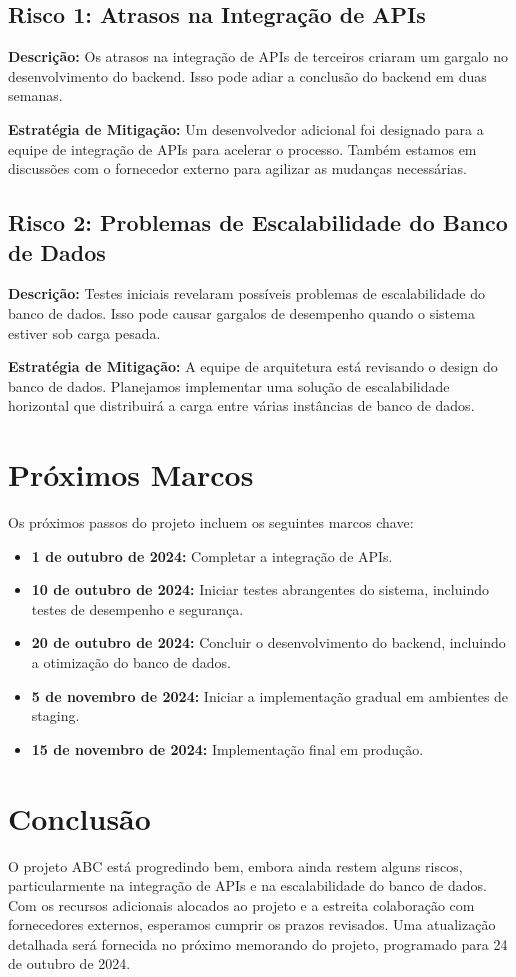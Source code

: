 \documentclass[12pt]{article}
\begin{document}
\subsection{Risco 1: Atrasos na Integração de APIs}
\textbf{Descrição:} Os atrasos na integração de APIs de terceiros criaram um gargalo no desenvolvimento do backend. Isso pode adiar a conclusão do backend em duas semanas.

\textbf{Estratégia de Mitigação:} Um desenvolvedor adicional foi designado para a equipe de integração de APIs para acelerar o processo. Também estamos em discussões com o fornecedor externo para agilizar as mudanças necessárias.

\subsection{Risco 2: Problemas de Escalabilidade do Banco de Dados}
\textbf{Descrição:} Testes iniciais revelaram possíveis problemas de escalabilidade do banco de dados. Isso pode causar gargalos de desempenho quando o sistema estiver sob carga pesada.

\textbf{Estratégia de Mitigação:} A equipe de arquitetura está revisando o design do banco de dados. Planejamos implementar uma solução de escalabilidade horizontal que distribuirá a carga entre várias instâncias de banco de dados.

\section{Próximos Marcos}
Os próximos passos do projeto incluem os seguintes marcos chave:

\begin{itemize}
    \item \textbf{1 de outubro de 2024:} Completar a integração de APIs.
    \item \textbf{10 de outubro de 2024:} Iniciar testes abrangentes do sistema, incluindo testes de desempenho e segurança.
    \item \textbf{20 de outubro de 2024:} Concluir o desenvolvimento do backend, incluindo a otimização do banco de dados.
    \item \textbf{5 de novembro de 2024:} Iniciar a implementação gradual em ambientes de staging.
    \item \textbf{15 de novembro de 2024:} Implementação final em produção.
\end{itemize}

\section{Conclusão}
O projeto ABC está progredindo bem, embora ainda restem alguns riscos, particularmente na integração de APIs e na escalabilidade do banco de dados. Com os recursos adicionais alocados ao projeto e a estreita colaboração com fornecedores externos, esperamos cumprir os prazos revisados. Uma atualização detalhada será fornecida no próximo memorando do projeto, programado para 24 de outubro de 2024.
\end{document}
